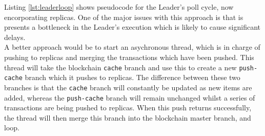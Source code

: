 \documentclass[12pt,a4paper,twoside,openright]{report}
\begin{document}
	Listing \ref{lst:leaderloop} shows pseudocode for the Leader's poll cycle, now encorporating replicas. 
	One of the major issues with this approach is that is presents a bottleneck in the Leader's execution which is likely to cause significant delays.\\
	
	A better approach would be to start an asychronous thread, which is in charge of pushing to replicas and merging the transactions which have been pushed.
	This thread will take the blockchain \texttt{cache} branch and use this to create a new \texttt{push-cache} branch which it pushes to replicas.
	The difference between these two branches is that the \texttt{cache} branch will constantly be updated as new items are added, whereas the \texttt{push-cache} branch will remain unchanged whilst a series of transactions are being pushed to replicas. 
	When this push returns successfully, the thread will then merge this branch into the blockchain master branch, and loop.
\end{document}
